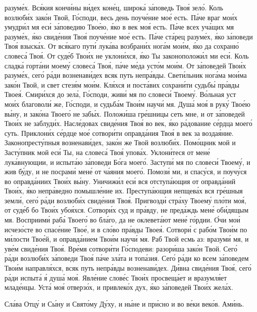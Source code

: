 разуме́х. Вся́кия кончи́ны ви́дех коне́ц, широка́ за́поведь Твоя́ зело́. Коль
возлюби́х зако́н Твой, Го́споди, весь день поуче́ние мое́ есть. Па́че
враг мои́х умудри́л мя еси́ за́поведию Твое́ю, я́ко в век моя́ есть.
Па́че всех уча́щих мя разуме́х, я́ко свиде́ния Твоя́ поуче́ние мое́ есть.
Па́че ста́рец разуме́х, я́ко за́поведи Твоя́ взыска́х. От вся́каго пути́
лука́ва возбрани́х нога́м мои́м, я́ко да сохраню́ словеса́ Твоя́. От суде́б
Твои́х не уклони́хся, я́ко Ты законоположи́л ми еси́. Коль сладка́
горта́ни моему́ словеса́ Твоя́, па́че ме́да усто́м мои́м. От за́поведей Твои́х
разуме́х, сего́ ра́ди возненави́дех всяк путь непра́вды. Свети́льник нога́ма
мои́ма зако́н Твой, и свет стезя́м мои́м. Кля́хся и поста́вих сохрани́ти
судьбы́ пра́вды Твоея́. Смири́хся до зела́, Го́споди, живи́ мя по словеси́
Твоему́. Во́льная уст мои́х благоволи́ же, Го́споди, и судьба́м Твои́м
научи́ мя. Душа́ моя́ в руку́ Твое́ю вы́ну, и зако́на Твоего́ не забы́х.
Положи́ша гре́шницы сеть мне, и от за́поведей Твои́х не заблуди́х.
Насле́довах свиде́ния Твоя́ во век, я́ко ра́дование се́рдца моего́ суть.
Приклони́х се́рдце мое́ сотвори́ти оправда́ния Твоя́ в век за воздая́ние.
Законопресту́пныя возненави́дех, зако́н же Твой возлюби́х. Помо́щник мой и
Засту́пник мой еси́ Ты, на словеса́ Твоя́ упова́х. Уклони́теся от мене́
лука́внующии, и испыта́ю за́поведи Бо́га моего́. Заступи́ мя по словеси́
Твоему́, и жив бу́ду, и не посрами́ мене́ от ча́яния моего́. Помози́ ми, и
спасу́ся, и поучу́ся во оправда́ниих Твои́х вы́ну. Уничижи́л еси́ вся
отступа́ющия от оправда́ний Твои́х, я́ко непра́ведно помышле́ние их.
Преступа́ющия непщева́х вся гре́шныя земли́, сего́ ра́ди возлюби́х
свиде́ния Твоя́. Пригвозди́ стра́ху Твоему́ пло́ти моя́, от суде́б бо Твои́х
убоя́хся. Сотвори́х суд и пра́вду, не преда́ждь мене́ оби́дящым мя.
Восприими́ раба́ Твоего́ во бла́го, да не оклевета́ют мене́ го́рдии. О́чи
мои́ исчезо́сте во спасе́ние Твое́, и в сло́во пра́вды Твоея́. Сотвори́ с
рабо́м Твои́м по ми́лости Твое́й, и оправда́нием Твои́м научи́ мя. Раб
Твой есмь аз: вразуми́ мя, и уве́м свиде́ния Твоя́. Вре́мя сотвори́ти
Го́сподеви: разори́ша зако́н Твой. Сего́ ра́ди возлюби́х за́поведи Твоя́ па́че
зла́та и топа́зия. Сего́ ра́ди ко всем за́поведем Твои́м направля́хся,
всяк путь непра́вды возненави́дех. Ди́вна свиде́ния Твоя́, сего́ ра́ди
испыта́ я́ душа́ моя́. Явле́ние слове́с Твои́х просвеща́ет и вразумля́ет
младе́нцы. Уста́ моя́ отверзо́х, и привлеко́х дух, я́ко за́поведей Твои́х
жела́х.
   


   Сла́ва Отцу́ и Сы́ну и Свято́му Ду́ху, и ны́не и при́сно и во ве́ки веко́в.
Ами́нь.


